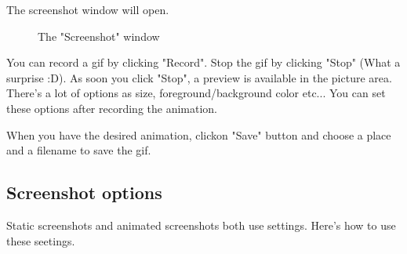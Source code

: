 \documentclass[10pt]{report}
\begin{document}
The screenshot window will open.\newline
\begin{figure}[H]
\centering
{}
\caption{The "Screenshot" window}
\end{figure}

You can record a gif by clicking "Record".\newline
Stop the gif by clicking "Stop" (What a surprise :D).\newline
As soon you click "Stop", a preview is available in the picture area.\newline
There's a lot of options as size, foreground/background color etc...\newline
You can set these options after recording the animation.\newline

When you have the desired animation, clickon "Save" button and choose a place and a filename to save the gif.\newline

\subsection{Screenshot options}

Static screenshots and animated screenshots both use settings. Here's how to use these seetings.\newline
\end{document}
